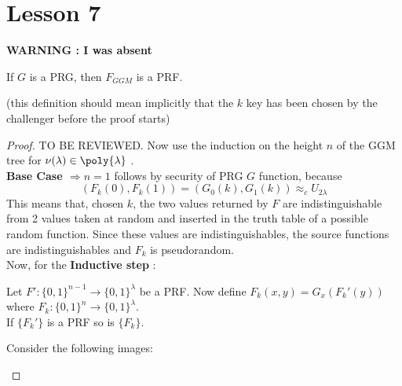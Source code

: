 \chapter*{Lesson 7}
\textbf{WARNING : I was absent} 
\begin{theorem}
    If $G$ is a PRG, then $F_{GGM}$ is a PRF.
\end{theorem}
(this definition should mean implicitly that the $k$ key has been chosen by the
challenger before the proof starts)
\begin{proof} TO BE REVIEWED.
    Now use the induction on the height $n$ of the GGM tree for $\nu(\lambda)
    \in \poly{\lambda} $ .\\
    
    \textbf{Base Case $\Rightarrow n=1$} follows by security of PRG $G$ function,
    because
    \[
        (F_{k}(0), F_{k}(1))=(G_{0}(k), G_{1}(k)) \approx_{c} U_{2\lambda}
    \]
    This means that, chosen $k$, the two values returned by $F$ are
    indistinguishable from 2 values taken at random and inserted in the
    truth table of a possible random function. Since these values are
    indistinguishables, the source functions are indistinguishables and $F_{k}$
    is pseudorandom.\\
    
    Now, for the \textbf{Inductive step} :\\
    \begin{lemma}
       Let $F':\{0,1\}^{n-1} \to \{0,1\}^{\lambda} $ be a PRF.
       Now define $F_{k}(x,y)=G_{x}(F_{k}'(y))$ where $F_{k}:\{0,1\}^{n} \to
       \{0,1\}^{\lambda} $.\\
       If $\{F_{k}'\}$ is a PRF so is $ \{F_{k}\}$.
    \end{lemma}
    
    Consider the following images:

    
    \newpage
    \begin{figure}[h!]
       \centering
       \sdinit{}
\end{figure}
\end{proof}
